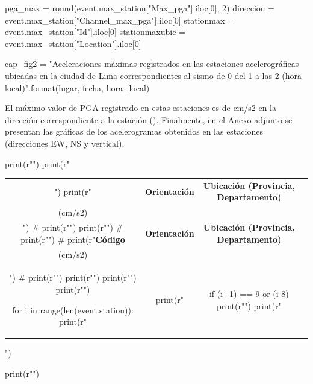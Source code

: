 \documentclass[11pt, a4paper]{report}
\begin{document}
\begin{pycode}
pga_max = round(event.max_station["Max_pga"].iloc[0], 2)
direccion = event.max_station["Channel_max_pga"].iloc[0]
stationmax = event.max_station["Id"].iloc[0]
stationmaxubic = event.max_station["Location"].iloc[0]

cap_fig2 = "Aceleraciones máximas registrados en las estaciones acelerográficas ubicadas en la ciudad de Lima correspondientes al sismo de {0} del {1} a las {2} (hora local)".format(lugar, fecha, hora_local)

\end{pycode}

\newpage
\noindent
El máximo valor de PGA registrado en estas estaciones es de  cm/s2 en la dirección  
correspondiente a la estación  ().
Finalmente, en el Anexo adjunto se presentan las gráficas de los acelerogramas obtenidos 
en las  estaciones (direcciones EW, NS y vertical).

\begin{pycode}

print(r"\renewcommand{\arraystretch}{1.2}")
print(r"\begin{longtable}{|c|c|c|c|}")
print(r"\caption{%
print(r"\hline")
print(r"\textbf{Código} & \textbf{Orientación} & \textbf{Ubicación (Provincia, Departamento)} & \textbf{\begin{tabular}[c]{@{}c@{}}PGA\\ (cm/s2)\end{tabular}} \\ \hline")
# print(r"\hline")
print(r"\endfirsthead")
# print(r"\hline")
# print(r"\textbf{Código} & \textbf{Orientación} & \textbf{Ubicación (Provincia, Departamento)} & \textbf{\begin{tabular}[c]{@{}c@{}}PGA\\ (cm/s2)\end{tabular}} \\ \hline")
# print(r"\hline")
print(r"\endhead")
print(r"\endfoot")
print(r"\endlastfoot")

for i in range(len(event.station)):
    print(r"\multirow{3}{*}{%
    print(r" & %
    print(r" & %
    if (i+1) == 9 or (i-8) %
        print(r"\pagebreak")
print(r"\end{longtable}")

print(r"\newpage")

\end{pycode}
\end{document}

